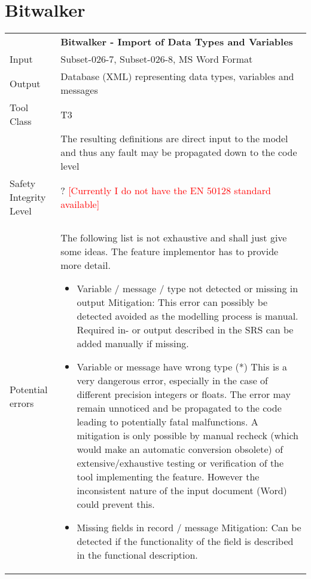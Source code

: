  \section{Bitwalker}
\begin{longtable}{lp{}}
&\textbf{Bitwalker - Import of Data Types and Variables}\\
Input&Subset-026-7, Subset-026-8, MS Word Format\\
Output&Database (XML) representing data types, variables and messages\\
Tool Class&T3\\
          &The resulting definitions are direct input to the model and thus any fault may be propagated down to the code level\\
Safety Integrity Level&? \textcolor{red}{[Currently I do not have the EN 50128 standard available]}\\
Potential errors&The following list is not exhaustive and shall just give some ideas. The feature implementor has to provide more detail.
                                \begin{itemize}
                                  \item Variable / message / type not detected or missing in output\newline
                                       Mitigation: This error can possibly be detected avoided as the modelling process is manual. Required in- or output described in the
                                                   SRS can be added manually if missing.
                                  \item Variable or message have wrong type (*)\newline
                                       This is a very dangerous error, especially in the case of different precision integers or floats. The error may
                                       remain unnoticed and be propagated to the code leading to potentially fatal malfunctions. A mitigation is only possible by
                                       manual recheck (which would make an automatic conversion obsolete) of extensive/exhaustive testing or verification of the tool 
                                       implementing the feature. However the inconsistent nature of the input document (Word) could prevent this.
                                  \item Missing fields in record / message\newline
                                       Mitigation: Can be detected if the functionality of the field is described in the functional description.

\end{itemize}
\end{longtable}
